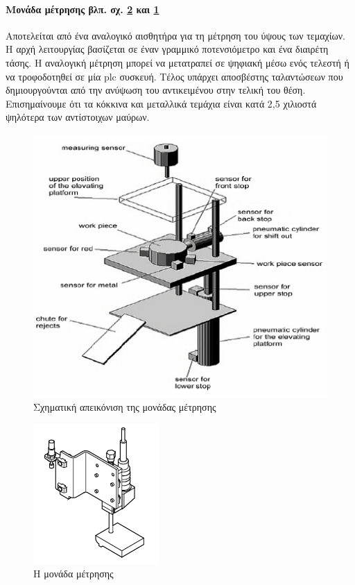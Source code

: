 \documentclass[a4paper,12pt,twoside]{report}
\begin{document}
{				\paragraph{Μονάδα μέτρησης {\footnotesize βλπ. σχ. \ref{φωτ:Η μονάδα μέτρησης από Festo} και \ref{φωτ:Σχηματική απεικόνιση της μονάδας μέτρησης από Θράμπο}}} {Αποτελείται από ένα αναλογικό αισθητήρα για τη μέτρηση του ύψους των τεμαχίων. Η αρχή λειτουργίας βασίζεται σε έναν γραμμικό ποτενσιόμετρο και ένα διαιρέτη τάσης. Η αναλογική μέτρηση μπορεί να μετατραπεί σε ψηφιακή μέσω ενός τελεστή ή να τροφοδοτηθεί σε μία plc συσκευή. Τέλος υπάρχει αποσβέστης ταλαντώσεων που δημιουργούνται από την ανύψωση του αντικειμένου στην τελική του θέση.\\Επισημαίνουμε ότι τα κόκκινα και μεταλλικά τεμάχια είναι κατά 2,5 χιλιοστά ψηλότερα των αντίστοιχων μαύρων.
				}
				\begin{figure}[hp]
					\centering
					\includegraphics[scale=1]{TestingStationPartsThrambo.png}
					\caption{Σχηματική απεικόνιση της μονάδας μέτρησης \cite{ΤοΦυσικόΣύστημαFestoMPS}}
					\label{φωτ:Σχηματική απεικόνιση της μονάδας μέτρησης από Θράμπο}
				\end{figure}	
				
				\begin{figure}[hp]
					\centering
					\includegraphics[scale=1]{TestingStationMeasuringModule.png}
					\caption{Η μονάδα μέτρησης \cite{FestoMPSTestingStationManual}}
					\label{φωτ:Η μονάδα μέτρησης από Festo}
				\end{figure}			
				
}
\end{document}
